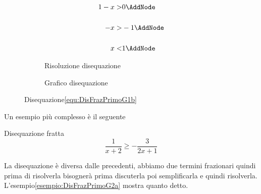 \begin{figure}
	\centering
	\begin{subfigure}[]{\linewidth}
		\begin{NodesList}
			\centering
			\begin{align*}
				1-x>& 0\AddNode\\[.5cm]
				-x>&-1\AddNode\\[.5cm]
				x<&1\AddNode
			\end{align*}
		\end{NodesList}
		\caption{Risoluzione disequazione}
		\label{svo:DisFrazPrimoGìb}
	\end{subfigure}%
	\qquad
	\begin{subfigure}[]{\linewidth}
		\centering
		\caption{Grafico disequazione}
		\label{graf:DisFrazPrimoG1b}
	\end{subfigure}%
	\captionsetup{format=esempio,list=no}
	\caption{Disequazione\nobs\vref{equ:DisFrazPrimoG1b}}
	\label{esempio:DisFrazPrimoG1b}
\end{figure}

Un esempio più complesso è il seguente
\begin{esempiot}{Disequazione fratta}{}
\begin{equation}
\dfrac{1}{x+2}\geq-\dfrac{3}{2x+1}\label{equ:DisFrazPrimoG2}
\end{equation}
\end{esempiot}

La disequazione è diversa dalle precedenti, abbiamo due termini frazionari quindi prima di risolverla bisognerà prima discuterla poi semplificarla e quindi  risolverla. L'esempio\nobs\vref{esempio:DisFrazPrimoG2a} mostra quanto detto. 

